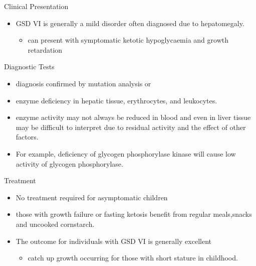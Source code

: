 \documentclass[presentation, smaller]{beamer}
\begin{document}
\begin{frame}[label={sec:org063660f}]{Clinical Presentation}
\begin{itemize}
\item GSD VI is generally a mild disorder often diagnosed due to hepatomegaly.
\begin{itemize}
\item can present with symptomatic ketotic hypoglycaemia and growth retardation
\end{itemize}
\end{itemize}
\end{frame}
\begin{frame}[label={sec:org3883bfa}]{Diagnostic Tests}
\begin{itemize}
\item diagnosis confirmed by mutation analysis or
\item enzyme deficiency in hepatic tissue, erythrocytes, and leukocytes.
\item enzyme activity may not always be reduced in blood and even in liver
tissue may be difficult to interpret due to residual activity and
the effect of other factors.
\item For example, deficiency of glycogen phosphorylase kinase will cause
low activity of glycogen phosphorylase.
\end{itemize}
\end{frame}
\begin{frame}[label={sec:org2b3d81f}]{Treatment}
\begin{itemize}
\item No treatment required for asymptomatic children
\item those with growth failure or fasting ketosis benefit from regular
meals,snacks and uncooked cornstarch.
\item The outcome for individuals with GSD VI is generally excellent
\begin{itemize}
\item catch up growth occurring for those with short stature in childhood.
\end{itemize}
\end{itemize}
\end{frame}
\end{document}
